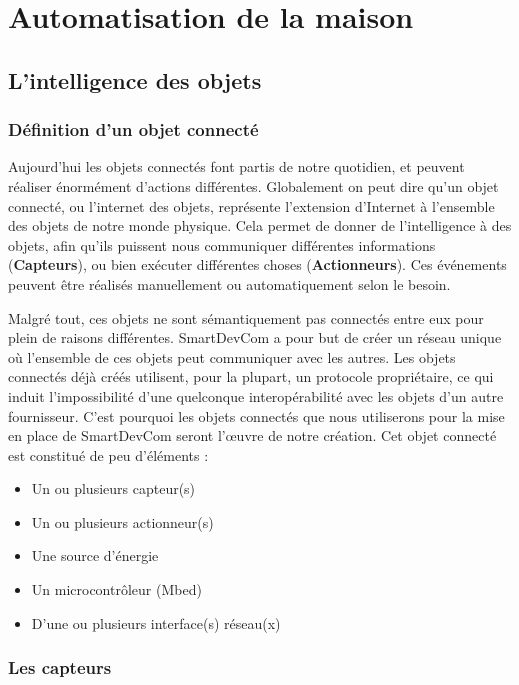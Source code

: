 ﻿\chapter{Automatisation de la maison}

\section{L’intelligence des objets}
	\subsection{Définition d’un objet connecté}
Aujourd'hui les objets connectés font partis de notre quotidien, et peuvent réaliser énormément d'actions différentes. Globalement on peut dire qu'un objet connecté, ou l'internet des objets, représente l'extension d'Internet à l'ensemble des objets de notre monde physique. Cela permet de donner de l'intelligence à des objets, afin qu'ils puissent nous communiquer différentes informations 
(\textbf{Capteurs}), ou bien exécuter différentes choses (\textbf{Actionneurs}). Ces événements peuvent être 
réalisés manuellement ou automatiquement selon le besoin.

Malgré tout, ces objets ne sont sémantiquement pas connectés entre eux pour plein de raisons différentes. 
SmartDevCom a pour but de créer un réseau unique où l'ensemble de ces objets peut communiquer avec les 
autres. Les objets connectés déjà créés utilisent, pour la plupart, un protocole propriétaire, ce qui induit 
l'impossibilité d'une quelconque interopérabilité avec les objets d'un autre fournisseur. C'est pourquoi les 
objets connectés que nous utiliserons pour la mise en place de SmartDevCom seront l'œuvre de notre création. 
Cet objet connecté est constitué de peu d'éléments :
\begin{itemize}
 \item Un ou plusieurs capteur(s)
 \item Un ou plusieurs actionneur(s)
 \item Une source d'énergie
 \item Un microcontrôleur (Mbed)
 \item D'une ou plusieurs interface(s) réseau(x)
\end{itemize}

	\subsection{Les capteurs}
	
